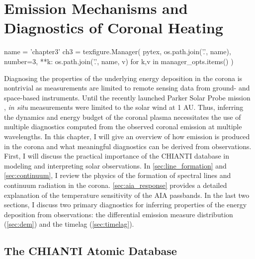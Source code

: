 \chapter{Emission Mechanisms and Diagnostics of Coronal Heating}\label{ch:diagnostics}

\begin{pycode}[chapter3]
name = 'chapter3'
ch3 = texfigure.Manager(
    pytex,
    os.path.join('.', name),
    number=3,
    **{k: os.path.join('.', name, v) for k,v in manager_opts.items()}
)
\end{pycode}

Diagnosing the properties of the underlying energy deposition in the corona is nontrivial as measurements are limited to remote sensing data from ground- and space-based instruments. Until the recently launched Parker Solar Probe mission \citep{fox_solar_2016}, \textit{in situ} measurements were limited to the solar wind at 1 AU. Thus, inferring the dynamics and energy budget of the coronal plasma necessitates the use of multiple diagnostics computed from the observed coronal emission at multiple wavelengths. In this chapter, I will give an overview of how emission is produced in the corona and what meaningful diagnostics can be derived from observations. First, I will discuss the practical importance of the CHIANTI database in modeling and interpreting solar observations. In \autoref{sec:line_formation} and \autoref{sec:continuum}, I review the physics of the formation of spectral lines and continuum radiation in the corona. \autoref{sec:aia_response} provides a detailed explanation of the temperature sensitivity of the AIA passbands. In the last two sections, I discuss two primary diagnostics for inferring properties of the energy deposition from observations: the differential emission measure distribution (\autoref{sec:dem}) and the timelag (\autoref{sec:timelag}).

\section{The CHIANTI Atomic Database}\label{subsec:chianti}

